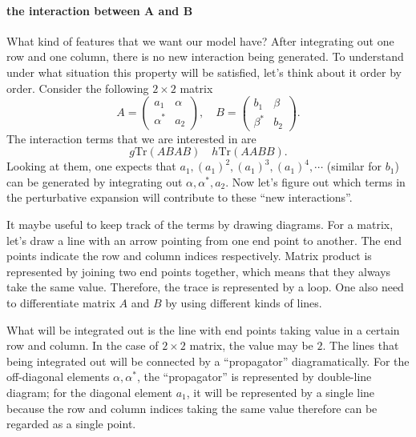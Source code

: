 \paragraph{the interaction between A and B}

What kind of features that we want our model have?
After integrating out one row and one column, there is no new interaction being generated.
To understand under what situation this property will be satisfied,
let's think about it order by order.
Consider the following $2 \times 2$ matrix
\[
	A = \begin{pmatrix} a_1 & \alpha \\ \alpha^* & a_2 \end{pmatrix},\quad B = \begin{pmatrix} b_1 & \beta \\ \beta^* & b_2 \end{pmatrix}
.\] 
The interaction terms that we are interested in are
\[
	g \mathrm{Tr}(ABAB) \quad h \mathrm{Tr}(AABB)
.\]
Looking at them, one expects that $a_1, (a_1)^2, (a_1)^3, (a_1)^4, \cdots$ (similar for $b_1$) can be generated by integrating out $\alpha,\alpha^*,a_2$.
Now let's figure out which terms in the perturbative expansion will contribute to these ``new interactions''.

It maybe useful to keep track of the terms by drawing diagrams.
For a matrix, let's draw a line with an arrow pointing from one end point to another.
The end points indicate the row and column indices respectively.
Matrix product is represented by joining two end points together,
which means that they always take the same value.
Therefore, the trace is represented by a loop.
One also need to differentiate matrix $A$ and $B$ by using different kinds of lines.

What will be integrated out is the line with end points taking value in a certain row and column.
In the case of $2 \times 2$ matrix, the value may be $2$.
The lines that being integrated out will be connected by a ``propagator'' diagramatically.
For the off-diagonal elements $\alpha,\alpha^*$, the ``propagator'' is represented by double-line diagram;
for the diagonal element $a_1$, it will be represented by a single line because the row and column indices taking the same value therefore can be regarded as a single point.

